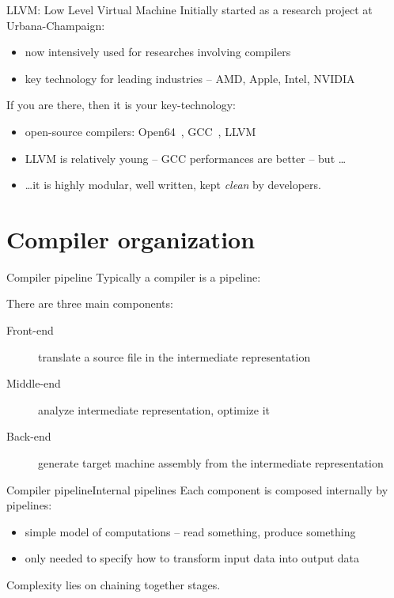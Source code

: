 \documentclass[10pt,mathserif]{beamer}
\begin{document}
\begin{frame}{LLVM: Low Level Virtual Machine}
Initially started as a research project at Urbana-Champaign:

\begin{itemize}
\item now intensively used for \alert{researches} involving compilers
\item key technology for \alert{leading industries} -- AMD, Apple, Intel,
      NVIDIA
\end{itemize}

\vfill
If you are there, then it is \alert{your key-technology}:

\begin{itemize}
\item open-source compilers: Open64~\cite{LOCAL:www/open64},
      GCC~\cite{LOCAL:www/gcc}, LLVM~\cite{LOCAL:www/llvm}
\item LLVM is relatively \alert{young} -- GCC performances are  better -- but \ldots
\item \ldots it is highly modular, well written, kept \emph{clean} by developers.
\end{itemize}
\end{frame}

\section{Compiler organization}
\begin{frame}{Compiler pipeline}
Typically a compiler is a \alert{pipeline}:

\begin{figure}
\centering

\end{figure}

\vfill
There are three main components:
\begin{description}
\item[Front-end] \alert{translate} a source file in the \alert{intermediate representation}
\item[Middle-end] \alert{analyze} intermediate representation, \alert{optimize}
                  it
\item[Back-end] \alert{generate} target machine assembly from the intermediate
                representation
\end{description}
\end{frame}

\begin{frame}{Compiler pipeline}{Internal pipelines}
Each component is composed internally by pipelines:

\begin{itemize}
\item simple model of computations -- \alert{read} something, \alert{produce}
      something
\item only needed to specify \alert{how to transform} input data into output
      data
\end{itemize}

Complexity lies on \alert{chaining} together stages.
\end{frame}
\end{document}
